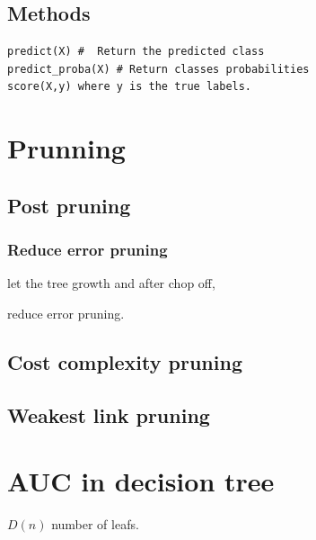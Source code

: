 \documentclass[10pt,a4paper]{article}
\begin{document}
\subsection{Methods }

\begin{verbatim}
predict(X) #  Return the predicted class
predict_proba(X) # Return classes probabilities
score(X,y) where y is the true labels. 
\end{verbatim}

\section{Prunning}
\subsection{Post pruning}
\subsubsection{Reduce error pruning}
let the tree growth and after chop off, 



reduce error pruning.

\subsection{Cost complexity pruning}


\subsection{Weakest link pruning}


\section{AUC in decision tree}

$D(n)$ number of leafs. 
\end{document}
